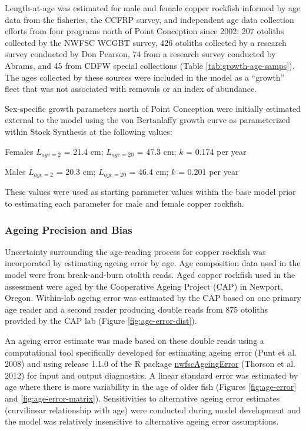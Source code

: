 \documentclass[11pt,
  english,
  letterpaper,
]{article}
\begin{document}
Length-at-age was estimated for male and female copper rockfish informed by age data from the fisheries, the CCFRP survey, and independent age data collection efforts from four programs north of Point Conception since 2002: 207 otoliths collected by the NWFSC WCGBT survey, 426 otoliths collected by a research survey conducted by Don Pearson, 74 from a research survey conducted by Abrams, and 45 from CDFW special collections (Table \ref{tab:growth-age-samps}). The ages collected by these sources were included in the model as a ``growth'' fleet that was not associated with removals or an index of abundance.

Sex-specific growth parameters north of Point Conception were initially estimated external to the model using the von Bertanlaffy growth curve as parameterized within Stock Synthesis at the following values:

\begin{centering}

Females $L_{age=2}$ = 21.4 cm; $L_{age=20}$ = 47.3 cm; $k$ = 0.174 per year

Males $L_{age=2}$ = 20.3 cm; $L_{age=20}$ = 46.4 cm; $k$ = 0.201 per year

\end{centering}

\vspace{0.50cm}

These values were used as starting parameter values within the base model prior to estimating each parameter for male and female copper rockfish.

\hypertarget{ageing-precision-and-bias}{%
\subsubsection{Ageing Precision and Bias}\label{ageing-precision-and-bias}}

Uncertainty surrounding the age-reading process for copper rockfish was incorporated by estimating ageing error by age. Age composition data used in the model were from break-and-burn otolith reads. Aged copper rockfish used in the assessment were aged by the Cooperative Ageing Project (CAP) in Newport, Oregon. Within-lab ageing error was estimated by the CAP based on one primary age reader and a second reader producing double reads from 875 otoliths provided by the CAP lab (Figure \ref{fig:age-error-dist}).

An ageing error estimate was made based on these double reads using a computational tool specifically developed for estimating ageing error (Punt et al. 2008) and using release 1.1.0 of the R package \href{https://github.com/nwfsc-assess/nwfscAgeingError}{nwfscAgeingError} (Thorson et al. 2012) for input and output diagnostics. A linear standard error was estimated by age where there is more variability in the age of older fish (Figures \ref{fig:age-error} and \ref{fig:age-error-matrix}). Sensitivities to alternative ageing error estimates (curvilinear relationship with age) were conducted during model development and the model was relatively insensitive to alternative ageing error assumptions.
\end{document}
